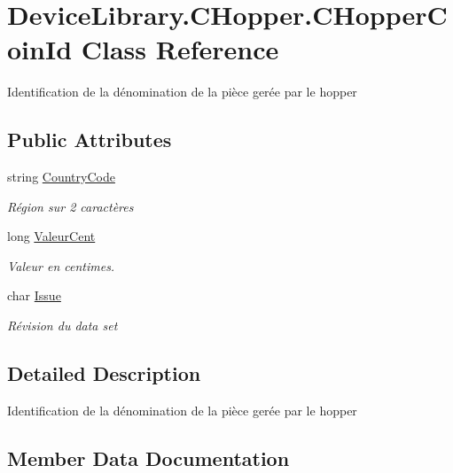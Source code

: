 \hypertarget{class_device_library_1_1_c_hopper_1_1_c_hopper_coin_id}{}\section{Device\+Library.\+C\+Hopper.\+C\+Hopper\+Coin\+Id Class Reference}
\label{class_device_library_1_1_c_hopper_1_1_c_hopper_coin_id}


Identification de la dénomination de la pièce gerée par le hopper  


\subsection*{Public Attributes}
\begin{DoxyCompactItemize}
\item 
string \mbox{\hyperlink{class_device_library_1_1_c_hopper_1_1_c_hopper_coin_id_a2539177528efbfaf371d5854f21a2bc3}{Country\+Code}}
\begin{DoxyCompactList}\small\item\em Région sur 2 caractères \end{DoxyCompactList}\item 
long \mbox{\hyperlink{class_device_library_1_1_c_hopper_1_1_c_hopper_coin_id_a0f682ecabc038f13d5f18db721c55cc8}{Valeur\+Cent}}
\begin{DoxyCompactList}\small\item\em Valeur en centimes. \end{DoxyCompactList}\item 
char \mbox{\hyperlink{class_device_library_1_1_c_hopper_1_1_c_hopper_coin_id_a7a0db9cd285047301297d776c0f97975}{Issue}}
\begin{DoxyCompactList}\small\item\em Révision du data set \end{DoxyCompactList}\end{DoxyCompactItemize}


\subsection{Detailed Description}
Identification de la dénomination de la pièce gerée par le hopper 



\subsection{Member Data Documentation}
\mbox{\label{class_device_library_1_1_c_hopper_1_1_c_hopper_coin_id_a2539177528efbfaf371d5854f21a2bc3}} 
